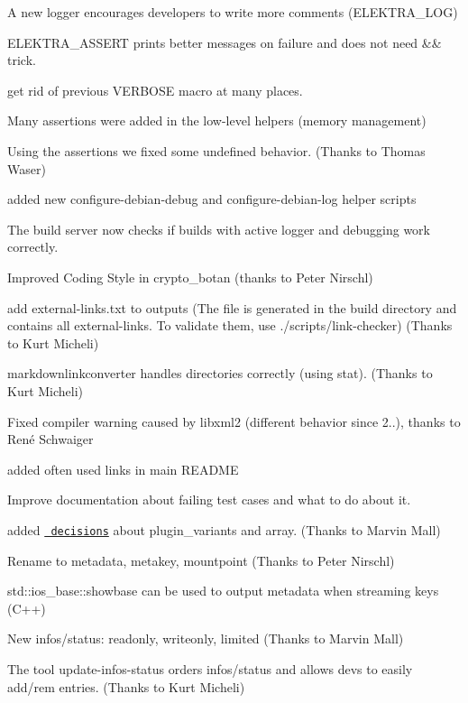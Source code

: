 \begin{DoxyItemize}
\item A new logger encourages developers to write more comments ({\ttfamily E\+L\+E\+K\+T\+R\+A\+\_\+\+L\+OG})
\item {\ttfamily E\+L\+E\+K\+T\+R\+A\+\_\+\+A\+S\+S\+E\+RT} prints better messages on failure and does not need {\ttfamily \&\&} trick.
\item get rid of previous {\ttfamily V\+E\+R\+B\+O\+SE} macro at many places.
\item Many assertions were added in the low-\/level helpers (memory management)
\item Using the assertions we fixed some undefined behavior. (Thanks to Thomas Waser)
\item added new {\ttfamily configure-\/debian-\/debug} and {\ttfamily configure-\/debian-\/log} helper scripts
\item The build server now checks if builds with active logger and debugging work correctly.
\item Improved Coding Style in crypto\+\_\+botan (thanks to Peter Nirschl)
\item add {\ttfamily external-\/links.\+txt} to {\ttfamily outputs} (The file is generated in the build directory and contains all external-\/links. To validate them, use {\ttfamily ./scripts/link-\/checker}) (Thanks to Kurt Micheli)
\item {\ttfamily markdownlinkconverter} handles directories correctly (using {\ttfamily stat}). (Thanks to Kurt Micheli)
\item Fixed compiler warning caused by libxml2 (different behavior since 2..), thanks to René Schwaiger
\item added often used links in main R\+E\+A\+D\+ME
\item Improve documentation about failing test cases and what to do about it.
\item added \href{https://master.libelektra.org/doc/decisions/}{\texttt{ decisions}} about {\ttfamily plugin\+\_\+variants} and {\ttfamily array}. (Thanks to Marvin Mall)
\item Rename to metadata, metakey, mountpoint (Thanks to Peter Nirschl)
\item std\+::ios\+\_\+base\+::showbase can be used to output metadata when streaming keys (C++)
\item New {\ttfamily infos/status}\+: {\ttfamily readonly}, {\ttfamily writeonly}, {\ttfamily limited} (Thanks to Marvin Mall)
\item The tool {\ttfamily update-\/infos-\/status} orders {\ttfamily infos/status} and allows devs to easily add/rem entries. (Thanks to Kurt Micheli)

\end{DoxyItemize}
